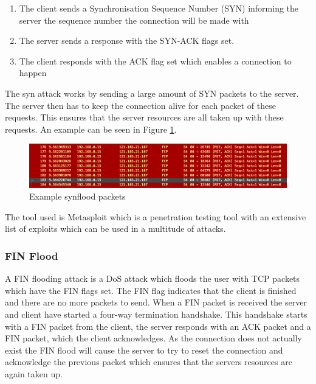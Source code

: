 \begin{enumerate}
\item The client sends a Synchronisation Sequence Number (SYN) informing the server the sequence number the connection will be made with

\item The server sends a response with the SYN-ACK flags set.

\item The client responds with the ACK flag set which enables a connection to happen
\end{enumerate}

The syn attack works by sending a large amount of SYN packets to the server. The server then has to keep the connection alive for each packet of these requests. This ensures that the server resources are all taken up with these requests\cite{syn}. An example can be seen in Figure \ref{fig:esfpr}.

\begin{figure}[H]
    \centering
    \includegraphics[scale = 0.4]{Images/synflood.png}
    \caption{Example synflood packets}
    \label{fig:esfpr}
\end{figure}

The tool used is Metasploit which is a penetration testing tool with an extensive list of exploits which can be used in a multitude of attacks.\cite{metasploit} 

\subsubsection{FIN Flood}
A FIN flooding attack is a DoS attack which floods the user with TCP packets which have the FIN flags set. The FIN flag indicates that the client is finished and there are no more packets to send. When a FIN packet is received the server and client have started a four-way termination handshake. This handshake starts with a FIN packet from the client, the server responds with an ACK packet and a FIN packet, which the client acknowledges. As the connection does not actually exist the FIN flood will cause the server to try to reset the connection and acknowledge the previous packet which ensures that the servers resources are again taken up. 

